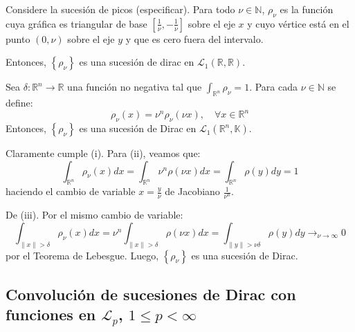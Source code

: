 \documentclass[12pt]{report}
\theoremstyle{largebreak}
\newcommand\cf[3]{\ensuremath{#1:#2\rightarrow#3}}
\newcommand\norm[1]{\ensuremath{\|#1\|}}
\begin{document}
    \begin{exa}
        Considere la sucesión de picos (especificar). Para todo $\nu\in\mathbb{N}$, $\rho_\nu$ es la función cuya gráfica es triangular de base $\left[\frac{1}{\nu},-\frac{1}{\nu} \right]$ sobre el eje $x$ y cuyo vértice está en el punto $(0,\nu)$ sobre el eje $y$ y que es cero fuera del intervalo.

        Entonces, $\left\{\rho_\nu \right\}$ es una sucesión de dirac en $\mathcal{L}_1(\mathbb{R},\mathbb{R})$.
    \end{exa}

    \begin{exa}
        Sea $\cf{\delta}{\mathbb{R}^n}{\mathbb{R}}$ una función no negativa tal que $\int_{\mathbb{R}^n}\rho_\nu=1$. Para cada $\nu\in\mathbb{N}$ se define:
        \begin{equation*}
            \rho_\nu(x)=\nu^n\rho_\nu(\nu x),\quad\forall x\in\mathbb{R}^n
        \end{equation*}
        Entonces, $\left\{\rho_\nu \right\}$ es una sucesión de Dirac en $\mathcal{L}_1(\mathbb{R}^n,\mathbb{K})$.

        Claramente cumple (i). Para (ii), veamos que:
        \begin{equation*}
            \int_{\mathbb{R}^n}\rho_\nu(x)dx=\int_{\mathbb{R}^n}\nu^n\rho(\nu x)dx=\int_{\mathbb{R}^n}\rho(y)dy=1
        \end{equation*}
        haciendo el cambio de variable $x=\frac{y}{\nu}$ de Jacobiano $\frac{1}{\nu^n}$.

        De (iii). Por el mismo cambio de variable:
        \begin{equation*}
            \int_{\norm{x}>\delta }\rho_\nu(x)dx=\nu^n\int_{\norm{x}>\delta}\rho(\nu x)dx=\int_{\norm{y}>\nu\delta}\rho(y)dy\longrightarrow_{\nu\rightarrow\infty}0
        \end{equation*}
        por el Teorema de Lebesgue. Luego, $\left\{\rho_\nu \right\}$ es una sucesión de Dirac.
    \end{exa}

    \subsection{Convolución de sucesiones de Dirac con funciones en $\mathcal{L}_p$, $1\leq p<\infty$}
\end{document}
